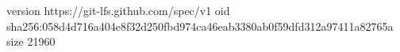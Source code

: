 version https://git-lfs.github.com/spec/v1
oid sha256:058d4d716a404e8f32d250fbd974ca46eab3380ab0f59dfd312a97411a82765a
size 21960
